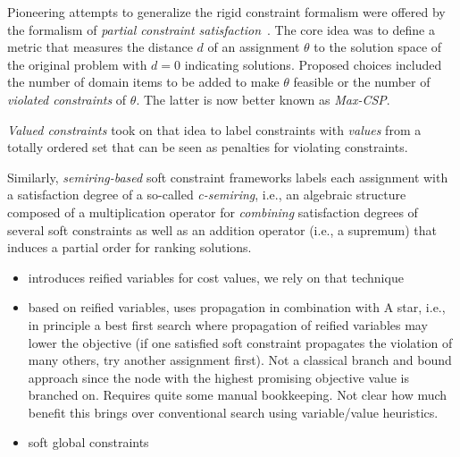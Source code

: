 Pioneering attempts to generalize the rigid constraint formalism
were offered by the formalism of \emph{partial constraint 
satisfaction}~\cite{FreuderW92}. The core idea was to define
a metric that measures the distance $d$ of an assignment $\theta$
to the solution space of the original problem
with $d=0$ indicating solutions. Proposed
choices included the number of domain items to be added to make 
$\theta$ feasible or the number of \emph{violated constraints} of 
$\theta$. The latter is now better known as \emph{Max-CSP}.

\emph{Valued constraints} took on that idea to label constraints
with \emph{values} from a totally ordered set that can be seen as 
penalties for violating constraints.

Similarly, \emph{semiring-based} soft constraint frameworks
labels each assignment with a satisfaction degree of a so-called 
\emph{c-semiring}, i.e., an algebraic structure composed of a 
multiplication operator for \emph{combining} satisfaction degrees of 
several soft constraints as well as an addition operator (i.e., a supremum) that induces a partial order for ranking solutions.

\begin{itemize}
\item {} \cite{petit2000meta} introduces reified variables for cost values, we rely
on that technique
\item {} \cite{sachenbacher2006conflict} based on reified variables, uses propagation in combination with A star, i.e., in principle a best first search where propagation of reified variables may lower the objective (if one satisfied soft constraint propagates the violation of many others, try another assignment first). Not a classical branch and bound approach since
the node with the highest promising objective value is branched on. Requires quite some manual bookkeeping. Not clear how much benefit this brings over conventional search using variable/value heuristics.  
\item \cite{van2011over} soft global constraints
\end{itemize}
